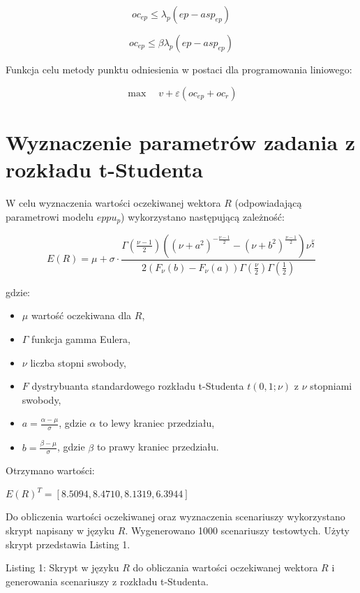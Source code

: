 \documentclass[12pt]{article}
\begin{document}
$$oc_{ep} \leqslant \lambda_p (ep - asp_{ep})$$

$$oc_{ep} \leqslant \beta \lambda_p (ep - asp_{ep})$$

Funkcja celu metody punktu odniesienia w postaci dla programowania liniowego:

$$\max \quad v + \varepsilon (oc_{ep} + oc_r)$$

\section{Wyznaczenie parametrów zadania z rozkładu t-Studenta}

W celu wyznaczenia wartości oczekiwanej wektora $R$ (odpowiadającą parametrowi modelu $eppu_p$) wykorzystano następującą zależność:

$$E(R) = \mu + \sigma \cdot \frac{\Gamma(\frac{\nu - 1}{2})((\nu + a^2)^{-\frac{\nu - 1}{2}} - (\nu + b^2)^{\frac{\nu - 1}{2}})\nu^{\frac{\nu}{2}}}{2(F_{\nu}(b) - F_{\nu}(a))\Gamma(\frac{\nu}{2})\Gamma(\frac{1}{2})}$$

gdzie:

\begin{itemize}
\item $\mu$ wartość oczekiwana dla $R$,
\item $\Gamma$ funkcja gamma Eulera,
\item $\nu$ liczba stopni swobody,
\item $F$ dystrybuanta standardowego rozkładu t-Studenta $t(0, 1; \nu)$ z $\nu$ stopniami swobody,
\item $a = \frac{\alpha-\mu}{\sigma}$, gdzie $\alpha$ to lewy kraniec przedziału,
\item $b = \frac{\beta-\mu}{\sigma}$, gdzie $\beta$ to prawy kraniec przedziału.
\end{itemize}

Otrzymano wartości:

$E(R)^T = [8.5094, 8.4710, 8.1319, 6.3944]$

Do obliczenia wartości oczekiwanej oraz wyznaczenia scenariuszy wykorzystano skrypt napisany w języku $R$. Wygenerowano 1000 scenariuszy testowtych. Użyty skrypt przedstawia Listing 1.

Listing 1: Skrypt w języku $R$ do obliczania wartości oczekiwanej wektora $R$ i generowania scenariuszy z rozkładu t-Studenta.
\end{document}
